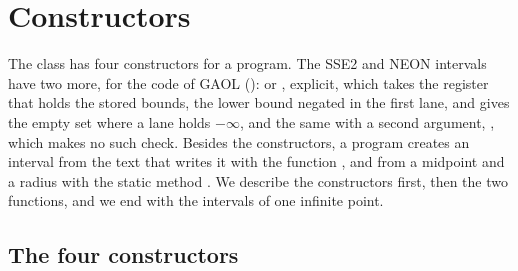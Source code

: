 \section{Constructors}\label{sec:constructors}
%

The class  has four constructors for a program. The SSE2 and
NEON intervals have two more, for the code of GAOL ():
 or ,
explicit, which takes the register that holds the stored bounds, the lower
bound negated in the first lane, and gives the empty set where a lane holds
$-\infty$, and the same with a second argument,
, which makes no such check. Besides the constructors, a program creates an interval from the
text that writes it with the function , and from a
midpoint and a radius with the static method . We describe the constructors first,
then the two functions, and we end with the intervals of one infinite point.

\subsection{The four constructors}

